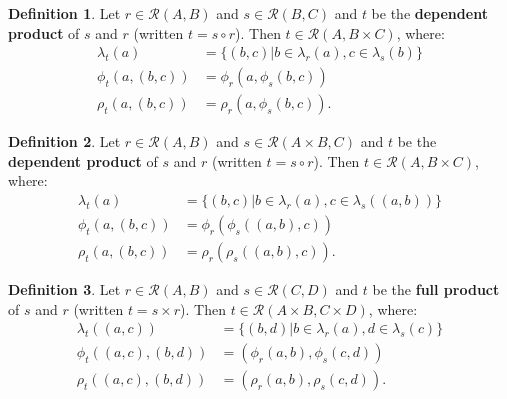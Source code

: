 \documentclass{article}
\theoremstyle{definition}
\newtheorem{definition}{Definition}[subsection]
\theoremstyle{plain}
\def\rule{\mathcal{R}}
\begin{document}
\begin{definition}
  Let $ r \in \rule (A, B) $
  and $ s \in \rule (B, C) $
  and $ t $ be the \textbf{dependent product} of $ s $ and $ r $
  (written $ t = s \circ r $).
  Then $ t \in \rule (A, B \times C) $, where:
  \begin{align}
    \lambda_t (a)         & = \{ (b, c) | b \in \lambda_r (a), c \in \lambda_s (b) \} \\
       \phi_t (a, (b, c)) & =    \phi_r (a, \phi_s (b, c)) \\
       \rho_t (a, (b, c)) & =    \rho_r (a, \phi_s (b, c)).
  \end{align}
\end{definition}

\begin{definition}
  Let $ r \in \rule (A, B) $
  and $ s \in \rule (A \times B, C) $
  and $ t $ be the \textbf{dependent product} of $ s $ and $ r $
  (written $ t = s \circ r $).
  Then $ t \in \rule (A, B \times C) $, where:
  \begin{align}
    \lambda_t (a)         & = \{ (b, c) | b \in \lambda_r (a), c \in \lambda_s ((a, b)) \} \\
       \phi_t (a, (b, c)) & =    \phi_r (\phi_s ((a, b), c)) \\
       \rho_t (a, (b, c)) & =    \rho_r (\rho_s ((a, b), c)).
  \end{align}
\end{definition}

\begin{definition}
  Let $ r \in \rule (A, B) $
  and $ s \in \rule (C, D) $
  and $ t $ be the \textbf{full product} of $ s $ and $ r $
  (written $ t = s \times r $).
  Then $ t \in \rule (A \times B, C \times D) $, where:
  \begin{align}
    \lambda_t ((a, c))         & = \{ (b, d) | b \in \lambda_r (a), d \in \lambda_s (c) \} \\
       \phi_t ((a, c), (b, d)) & = (\phi_r (a, b), \phi_s (c, d)) \\
       \rho_t ((a, c), (b, d)) & = (\rho_r (a, b), \rho_s (c, d)).
  \end{align}
\end{definition}
\end{document}
